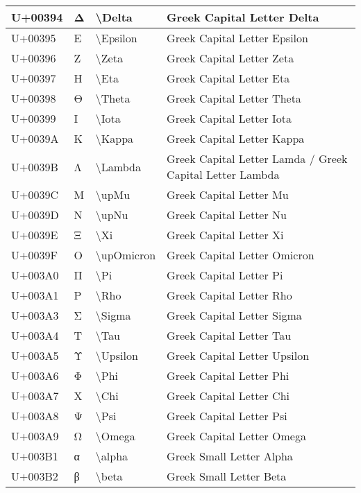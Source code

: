 \begin{table}[h]
\begin{tabulary}{\linewidth}{|L|L|L|L|}
\hline
U+00394 & Δ & {\textbackslash}Delta & Greek Capital Letter Delta \\
\hline
U+00395 & Ε & {\textbackslash}Epsilon & Greek Capital Letter Epsilon \\
\hline
U+00396 & Ζ & {\textbackslash}Zeta & Greek Capital Letter Zeta \\
\hline
U+00397 & Η & {\textbackslash}Eta & Greek Capital Letter Eta \\
\hline
U+00398 & Θ & {\textbackslash}Theta & Greek Capital Letter Theta \\
\hline
U+00399 & Ι & {\textbackslash}Iota & Greek Capital Letter Iota \\
\hline
U+0039A & Κ & {\textbackslash}Kappa & Greek Capital Letter Kappa \\
\hline
U+0039B & Λ & {\textbackslash}Lambda & Greek Capital Letter Lamda / Greek Capital Letter Lambda \\
\hline
U+0039C & Μ & {\textbackslash}upMu & Greek Capital Letter Mu \\
\hline
U+0039D & Ν & {\textbackslash}upNu & Greek Capital Letter Nu \\
\hline
U+0039E & Ξ & {\textbackslash}Xi & Greek Capital Letter Xi \\
\hline
U+0039F & Ο & {\textbackslash}upOmicron & Greek Capital Letter Omicron \\
\hline
U+003A0 & Π & {\textbackslash}Pi & Greek Capital Letter Pi \\
\hline
U+003A1 & Ρ & {\textbackslash}Rho & Greek Capital Letter Rho \\
\hline
U+003A3 & Σ & {\textbackslash}Sigma & Greek Capital Letter Sigma \\
\hline
U+003A4 & Τ & {\textbackslash}Tau & Greek Capital Letter Tau \\
\hline
U+003A5 & Υ & {\textbackslash}Upsilon & Greek Capital Letter Upsilon \\
\hline
U+003A6 & Φ & {\textbackslash}Phi & Greek Capital Letter Phi \\
\hline
U+003A7 & Χ & {\textbackslash}Chi & Greek Capital Letter Chi \\
\hline
U+003A8 & Ψ & {\textbackslash}Psi & Greek Capital Letter Psi \\
\hline
U+003A9 & Ω & {\textbackslash}Omega & Greek Capital Letter Omega \\
\hline
U+003B1 & α & {\textbackslash}alpha & Greek Small Letter Alpha \\
\hline
U+003B2 & β & {\textbackslash}beta & Greek Small Letter Beta \\

\end{tabulary}
\end{table}
